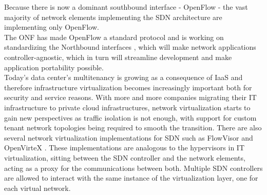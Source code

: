 Because there is now a dominant southbound interface - OpenFlow - the vast majority of network elements implementing the \gls{SDN} architecture are implementing only OpenFlow.\\
%
The \gls{ONF} has made OpenFlow a standard protocol and is working on standardizing the Northbound interfaces \cite{OFWP}, which will make network applications controller-agnostic, which in turn will streamline development and make application portability possible.\\
%
Today's data center's multitenancy is growing as a consequence of \gls{IaaS} and therefore infrastructure virtualization becomes increasingly important both for security and service reasons.
With more and more companies migrating their \gls{IT} infrastructure to private cloud infrastructures, network virtualization starts to gain new perspectives as traffic isolation is not enough, with support for custom tenant network topologies being required to smooth the transition.
There are also several network virtualization implementations for \gls{SDN} such as FlowVisor \cite{Sherwooda}\cite{Sherwood} and OpenVirteX \cite{Kreutz2014}.
These implementations are analogous to the hypervisors in \gls{IT} virtualization, sitting between the \gls{SDN} controller and the network elements, acting as a proxy for the communications between both.
Multiple \gls{SDN} controllers are allowed to interact with the same instance of the virtualization layer, one for each virtual network.\\
%
